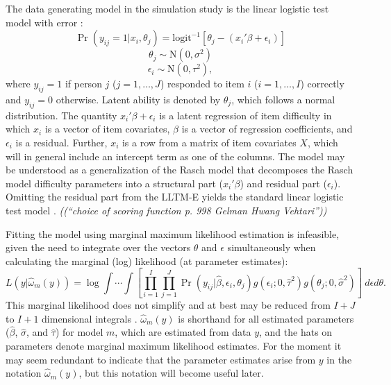 The data generating model in the simulation study is the linear logistic test model with error \parencite[LLTM-E;][]{DeBoeck2008}:
\begin{equation}
	\Pr(y_{ij} = 1 | x_i, \theta_j) =
	\mathrm{logit}^{-1} \left [ \theta_j - (x_i'\beta + \epsilon_i) \right ]
\end{equation}
\begin{equation}
	\theta_j \sim \mathrm{N}(0, \sigma^2)
\end{equation}
\begin{equation}
	\epsilon_i \sim \mathrm{N}(0, \tau^2)
,\end{equation}
where $y_{ij} = 1$ if person $j$ ($j = 1, \dotsc, J$) responded to item $i$ ($i = 1, \dotsc, I$) correctly and $y_{ij} = 0$ otherwise. 
Latent ability is denoted by $\theta_j$, which follows a normal distribution. 
The quantity $x_i'\beta + \epsilon_i$ is a latent regression of item difficulty in which $x_i$ is a vector of item covariates, $\beta$ is a vector of regression coefficients, and $\epsilon_i$ is a residual. 
Further, $x_i$ is a row from a matrix of item covariates $X$, which will in general include an intercept term as one of the columns.
The model may be understood as a generalization of the Rasch model \parencite{Rasch1960a} that decomposes the Rasch model difficulty parameters into a structural part ($x_i'\beta$) and residual part ($\epsilon_i$).
Omitting the residual part from the LLTM-E yields the standard linear logistic test model \parencite[LLTM;][]{Fischer1973}.
\emph{((``choice of scoring function p. 998 Gelman Hwang Vehtari''))}

Fitting the model using marginal maximum likelihood estimation is infeasible, given the need to integrate over the vectors $\theta$ and $\epsilon$ simultaneously when calculating the marginal (log) likelihood (at parameter estimates):
\begin{equation} \label{eq:lltme-likelihood}
	L(y | \hat \omega_m(y)) = \log 
		\int \cdots \int \left [
			\prod_{i=1}^I \prod_{j=1}^J
			\Pr(y_{ij} | \hat \beta, \epsilon_i, \theta_j)
			g(\epsilon_i ; 0, \hat \tau^2)
			g(\theta_j ; 0, \hat \sigma^2)
		\right ] ~d \epsilon d \theta
.\end{equation}
This marginal likelihood does not simplify and at best may be reduced from $I+J$ to $I+1$ dimensional integrals \parencite{goldstein1987multilevel, rasbash1994efficient}.
$\hat \omega_m(y)$ is shorthand for all estimated parameters ($\hat \beta$, $\hat \sigma$, and $\hat \tau$) for model $m$, which are estimated from data $y$, and the hats on parameters denote marginal maximum likelihood estimates. For the moment it may seem redundant to indicate that the parameter estimates arise from $y$ in the notation $\hat \omega_m(y)$, but this notation will become useful later.


